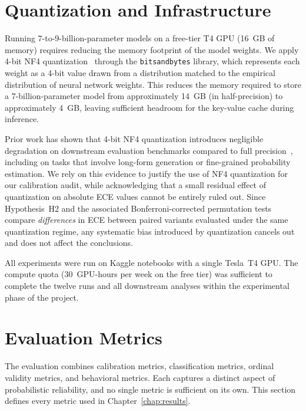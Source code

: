 \section{Quantization and Infrastructure}
\label{sec:met-infrastructure}

Running 7-to-9-billion-parameter models on a free-tier T4 GPU (16~GB of 
memory) requires reducing the memory footprint of the model weights. We 
apply 4-bit NF4 quantization~\cite{dettmers2023qlora} through the 
\texttt{bitsandbytes} library, which represents each weight as a 4-bit 
value drawn from a distribution matched to the empirical distribution of 
neural network weights. This reduces the memory required to store a 
7-billion-parameter model from approximately 14~GB (in half-precision) to 
approximately 4~GB, leaving sufficient headroom for the key-value cache 
during inference.

Prior work has shown that 4-bit NF4 quantization introduces negligible 
degradation on downstream evaluation benchmarks compared to full 
precision~\cite{dettmers2023qlora}, including on tasks that involve 
long-form generation or fine-grained probability estimation. We rely on 
this evidence to justify the use of NF4 quantization for our calibration 
audit, while acknowledging that a small residual effect of quantization 
on absolute ECE values cannot be entirely ruled out. Since Hypothesis~H2 
and the associated Bonferroni-corrected permutation tests compare 
\emph{differences} in ECE between paired variants evaluated under the 
same quantization regime, any systematic bias introduced by quantization 
cancels out and does not affect the conclusions.

All experiments were run on Kaggle notebooks with a single Tesla~T4 GPU. 
The compute quota (30~GPU-hours per week on the free tier) was sufficient 
to complete the twelve runs and all downstream analyses within the 
experimental phase of the project.

\section{Evaluation Metrics}
\label{sec:met-metrics}

The evaluation combines calibration metrics, classification metrics, 
ordinal validity metrics, and behavioral metrics. Each captures a distinct 
aspect of probabilistic reliability, and no single metric is sufficient on 
its own. This section defines every metric used in Chapter~\ref{chap:results}.

